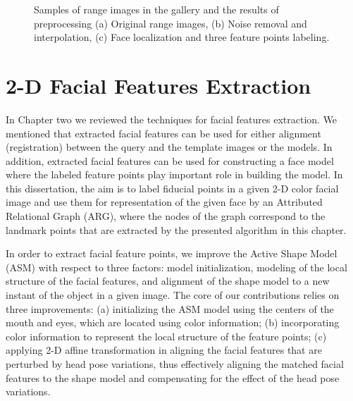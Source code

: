 \begin{figure}[tbp]
\begin{center}
 \caption{Samples of range images in the gallery and the
results of preprocessing (a) Original range images, (b) Noise
removal and interpolation, (c) Face localization and three feature
points labeling.} \label{fig_sample_preprocessing}
\end{center}
\end{figure}

\section{2-D Facial Features Extraction}
In Chapter two we reviewed the techniques for facial features
extraction. We mentioned that extracted facial features can be used
for either alignment (registration) between the query and the
template images or the models. In addition, extracted facial
features can be used for constructing a face model where the labeled
feature points play important role in building the model. In this
dissertation, the aim is to label fiducial points in a given 2-D
color facial image and use them for representation of the given face
by an Attributed Relational Graph (ARG), where the nodes of the
graph correspond to the landmark points that are extracted by the
presented algorithm in this chapter.

In order to extract facial feature points, we improve the Active
Shape Model (ASM) \cite{Cootes_1} with respect to three factors:
model initialization, modeling of the local structure of the facial
features, and alignment of the shape model to a new instant of the
object in a given image. The core of our contributions relies on
three improvements: (a) initializing the ASM model using the centers
of the mouth and eyes, which are located using color information;
(b) incorporating color information to represent the local structure
of the feature points; (c) applying 2-D affine transformation in
aligning the facial features that are perturbed by head pose
variations, thus effectively aligning the matched facial features to
the shape model and compensating for the effect of the head pose
variations.

